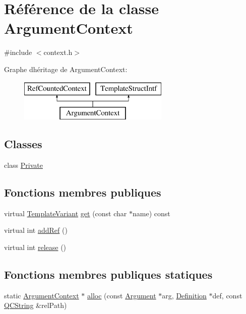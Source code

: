 \hypertarget{class_argument_context}{}\section{Référence de la classe Argument\+Context}
\label{class_argument_context}


{\ttfamily \#include $<$context.\+h$>$}

Graphe d\textquotesingle{}héritage de Argument\+Context\+:\begin{figure}[H]
\begin{center}
\leavevmode
\includegraphics[height=2.000000cm]{class_argument_context}
\end{center}
\end{figure}
\subsection*{Classes}
\begin{DoxyCompactItemize}
\item 
class \hyperlink{class_argument_context_1_1_private}{Private}
\end{DoxyCompactItemize}
\subsection*{Fonctions membres publiques}
\begin{DoxyCompactItemize}
\item 
virtual \hyperlink{class_template_variant}{Template\+Variant} \hyperlink{class_argument_context_a5791f1b4435f44464b2e7f06462ff8e2}{get} (const char $\ast$name) const 
\item 
virtual int \hyperlink{class_argument_context_ac494f4b56f0a590273034856f4e22728}{add\+Ref} ()
\item 
virtual int \hyperlink{class_argument_context_a4233e98a25aa25c9356b5584f2e338d6}{release} ()
\end{DoxyCompactItemize}
\subsection*{Fonctions membres publiques statiques}
\begin{DoxyCompactItemize}
\item 
static \hyperlink{class_argument_context}{Argument\+Context} $\ast$ \hyperlink{class_argument_context_ad007d7e5e54f16df19d03ec389077b9d}{alloc} (const \hyperlink{struct_argument}{Argument} $\ast$arg, \hyperlink{class_definition}{Definition} $\ast$def, const \hyperlink{class_q_c_string}{Q\+C\+String} \&rel\+Path)
\end{DoxyCompactItemize}


